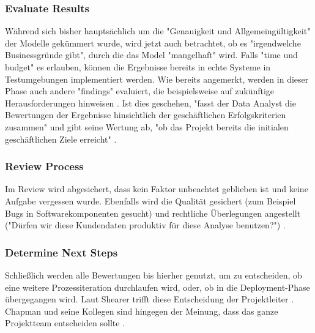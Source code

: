 \subsubsection{Evaluate Results}
Während sich bisher hauptsächlich um die "Genauigkeit und Allgemeingültigkeit" der Modelle gekümmert wurde, wird jetzt auch betrachtet, ob es "irgendwelche Businessgründe gibt", durch die das Model "mangelhaft" \citep[S.~18; eigene Übersetzung]{shearer_crisp-dm_2000} wird. Falls "time und budget" \citep[S.~26]{chapman_crisp-dm_2000} es erlauben, können die Ergebnisse bereits in echte Systeme in Testumgebungen implementiert werden. Wie bereits angemerkt, werden in dieser Phase auch andere "findings" evaluiert, die beispielsweise auf zukünftige Herausforderungen hinweisen \citep[S.~18]{shearer_crisp-dm_2000}. Ist dies geschehen, "fasst der Data Analyst die Bewertungen der Ergebnisse hinsichtlich der geschäftlichen Erfolgskriterien zusammen" und gibt seine Wertung ab, "ob das Projekt bereits die initialen geschäftlichen Ziele erreicht" \citep[S.~18; eigene Übersetzung]{shearer_crisp-dm_2000}.

\subsubsection{Review Process}
Im Review wird abgesichert, dass kein Faktor unbeachtet geblieben ist und keine Aufgabe vergessen wurde. Ebenfalls wird die Qualität gesichert (zum Beispiel Bugs in Softwarekomponenten gesucht) und rechtliche Überlegungen angestellt ("Dürfen wir diese Kundendaten produktiv für diese Analyse benutzen?") .

\subsubsection{Determine Next Steps}
Schließlich werden alle Bewertungen bis hierher genutzt, um zu entscheiden, ob eine weitere Prozessiteration durchlaufen wird, oder, ob in die Deployment-Phase übergegangen wird. Laut Shearer trifft diese Entscheidung der Projektleiter \citep[S.~18]{shearer_crisp-dm_2000}. Chapman und seine Kollegen sind hingegen der Meinung, dass das ganze Projektteam entscheiden sollte \citep[S.~17]{chapman_crisp-dm_2000}.

